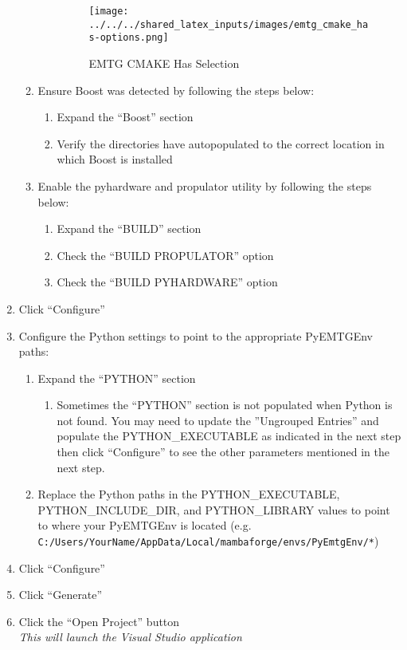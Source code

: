 \begin{enumerate}
\begin{enumerate}
\begin{enumerate}
\begin{figure}[H]
					\texttt{[image: ../../../shared\_latex\_inputs/images/emtg\_cmake\_has-options.png]}
					\caption{EMTG CMAKE Has Selection}
				\end{figure}
		\end{enumerate}
		\item Ensure Boost was detected by following the steps below:
		\begin{enumerate}
			\item Expand the ``Boost'' section
			\item Verify the directories have autopopulated to the correct location in which Boost is installed
		\end{enumerate}
		\item Enable the pyhardware and propulator utility by following the steps below:
		\begin{enumerate}
			\item Expand the ``BUILD'' section 
			\item Check the ``BUILD PROPULATOR'' option
			\item Check the ``BUILD PYHARDWARE'' option
		\end{enumerate}
	\end{enumerate}
	\item Click ``Configure''
	\item Configure the Python settings to point to the appropriate PyEMTGEnv paths:
		\begin{enumerate}
			\item Expand the ``PYTHON'' section
				\begin{enumerate}
					\item Sometimes the ``PYTHON'' section is not populated when Python is not found. You may need to update the ''Ungrouped Entries'' and populate the PYTHON\_EXECUTABLE as indicated in the next step then click ``Configure'' to see the other parameters mentioned in the next step.
				\end{enumerate}
			\item Replace the Python paths in the PYTHON\_EXECUTABLE, PYTHON\_INCLUDE\_DIR, and PYTHON\_LIBRARY values to point to where your PyEMTGEnv is located (e.g. \verb|C:/Users/YourName/AppData/Local/mambaforge/envs/PyEmtgEnv/*|)
		\end{enumerate}
	\item Click ``Configure''
	\item Click ``Generate''
	\item Click the ``Open Project'' button \\ \emph{This will launch the Visual Studio application}
\end{enumerate}
